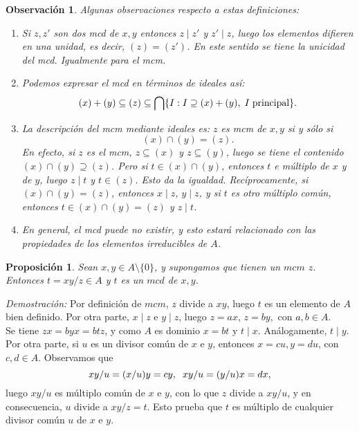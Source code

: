 \documentclass[12pt]{article}
\newtheorem{proposition}[theorem]{Proposición}
\newtheorem{observation}{Observación}[theorem]
\begin{document}
\begin{observation}\label{eq:obs} Algunas observaciones respecto a estas definiciones: \begin{enumerate}
\item Si $z, z'$ son dos mcd de $x,y$ entonces $z \mid z'$ y $z' \mid z$, luego los elementos difieren en una unidad, es decir, $(z) = (z')$. En este sentido se tiene la unicidad del mcd. Igualmente para el mcm.
\item Podemos expresar el mcd en términos de ideales así: $$(x) + (y) \subseteq (z) \subseteq \bigcap \lbrace I : I\supseteq (x) +(y), \hspace{0.1cm} I \hspace{0.1cm} \text{principal}\rbrace.$$
\item La descripción del mcm mediante ideales es: $z$ es mcm de $x,y$ si y sólo si $$(x) \cap (y) = (z).$$ En efecto, si $z$ es el mcm, $z \subseteq (x)$ y $z \subseteq (y)$, luego se tiene el contenido $(x) \cap (y) \supseteq (z)$. Pero si $t \in (x) \cap (y)$, entonces $t$ e múltiplo de $x$ y de $y$, luego $z \mid t$ y $t \in (z)$. Esto da la igualdad. Recíprocamente, si $(x) \cap (y) = (z)$, entonces $x \mid z$, $y \mid z$, y si $t$ es otro múltiplo común, entonces $t \in (x) \cap (y) = (z)$ y $z \mid t$.
\item En general, el mcd puede no existir, y esto estará relacionado con las propiedades de los elementos irreducibles de $A$.
\end{enumerate} 
\end{observation}

\begin{proposition} \label{eq:lemdiv} Sean $x, y \in A\setminus \lbrace 0 \rbrace$, y supongamos que tienen un $mcm$ $z$. Entonces $t = xy/z \in A$ y $t$ es un $mcd$ de $x,y$.
\end{proposition}
\emph{Demostración: } Por definición de $mcm$, $z$ divide a $xy$, luego $t$ es un elemento de $A$ bien definido. Por otra parte, $x \mid z$ e $y\mid z$, luego $z = ax$, $z =by,$ con $a,b \in A.$ \vspace{0.2cm}\\
Se tiene $zx =byx = btz$, y como $A$ es dominio $x = bt$ y $t \mid x$. Análogamente, $t \mid y$. Por otra parte, si $u$ es un divisor común de $x$ e $y$, entonces $x = cu, y = du$, con $c,d \in A$. Observamos que  $$xy/u = (x/u)y = cy, \hspace{0.2cm} xy/u = (y/u)x = dx,$$ luego $xy/u$ es múltiplo común de $x$ e $y$, con lo que $z$ divide a $xy/u$, y en consecuencia, $u$ divide a $xy/z = t$. Esto prueba que $t$ es múltiplo de cualquier divisor común $u$ de $x$ e $y$.
\end{document}
